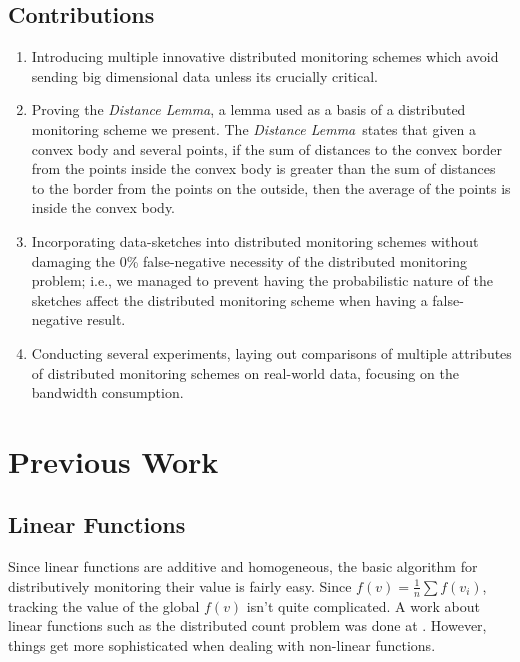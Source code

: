 \documentclass[10pt, conference]{IEEEtran}
\newcommand{\distanceLemma}{\textit{Distance Lemma}}
\begin{document}
\subsection{Contributions}
\begin{enumerate}
\item Introducing multiple innovative distributed monitoring schemes which avoid sending big dimensional data unless its crucially critical.
\item Proving the \distanceLemma , a lemma used as a basis of a distributed monitoring scheme we present. The \distanceLemma \ states that given a convex body and several points, if the sum of distances to the convex border from the points inside the convex body is greater than the sum of distances to the border from the points on the outside, then the average of the points is inside the convex body.
\item Incorporating data-sketches into distributed monitoring schemes without damaging the 0\% false-negative necessity of the distributed monitoring problem; i.e., we managed to prevent having the probabilistic nature of the sketches affect the distributed monitoring scheme when having a false-negative result.
\item Conducting several experiments, laying out comparisons of multiple attributes of distributed monitoring schemes on real-world data, focusing on the bandwidth consumption.
\end{enumerate}

\section{Previous Work}
\subsection{Linear Functions}
Since linear functions are additive and homogeneous, the basic algorithm for distributively monitoring their value is fairly easy. Since ${f(v) = \frac{1}{n}\sum f(v_i)}$, tracking the value of the global $f(v)$ isn't quite complicated. A work about linear functions such as the distributed count problem was done at \cite{keralapura2006communication}. However, things get more sophisticated when dealing with non-linear functions.
\end{document}
